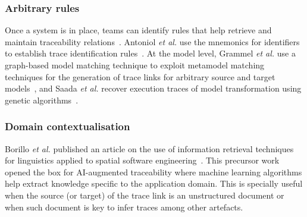 \subsubsection{Arbitrary rules} 
Once a system is in place, teams can identify rules that help retrieve and maintain traceability relations~\cite{mader2008-rule-based-maintenance-post-requirements-traceability,spanoudakis2004-rule-based-generation-of-req-traceability-relations}.
Antoniol \textit{et al.} use the mnemonics for identifiers to establish trace identification rules~\cite{antoniol2002-tracing-code-documentation-links}.
At the model level, Grammel \textit{et al.} use a graph-based model matching technique to exploit metamodel matching techniques for the generation of trace links for arbitrary source and target models~\cite{grammel2012-model-matching-for-traceability-in-MDE}, and Saada \textit{et al.} recover  execution traces of model transformation using genetic algorithms~\cite{Saada_2013}.


\subsubsection{Domain contextualisation} 
Borillo \textit{et al.} published an article on the use of information retrieval techniques for linguistics applied to spatial software engineering~\cite{borillo1992-linguistic-engineering-to-spacial-SE}. This precursor work opened the box for AI-augmented traceability where machine learning algorithms help extract knowledge specific to the application domain. This is specially useful when the source (or target) of the trace link is an unstructured document or when such document is key to infer traces among other artefacts.

